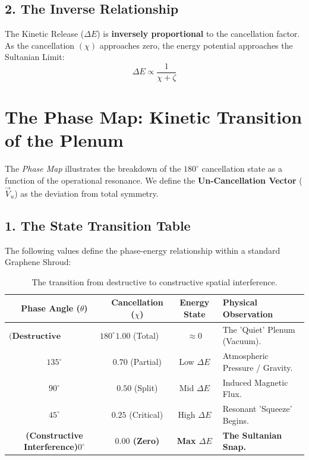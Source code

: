 \documentclass[11pt]{article}
\begin{document}
\subsection*{2. The Inverse Relationship}
The Kinetic Release ($\Delta E$) is \textbf{inversely proportional} to the cancellation factor. As the cancellation $(\chi)$ approaches zero, the energy potential approaches the Sultanian Limit:
\begin{equation}
    \Delta E \propto \frac{1}{\chi + \zeta}
\end{equation}

\section*{The Phase Map: Kinetic Transition of the Plenum}

The \textit{Phase Map} illustrates the breakdown of the $180^\circ$ cancellation state as a function of the operational resonance. We define the \textbf{Un-Cancellation Vector} ($\vec{V}_u$) as the deviation from total symmetry.

\subsection*{1. The State Transition Table}
The following values define the phase-energy relationship within a standard Graphene Shroud:

\begin{table}[h!]
\centering
\renewcommand{\arraystretch}{1.5}
\begin{tabular}{|c|c|c|l|}
\hline
\textbf{Phase Angle ($\theta$)} & \textbf{Cancellation ($\chi$)} & \textbf{Energy State} & \textbf{Physical Observation} \\ \hline
$\textbf{(Destructive Interference)} 180^\circ$ & $1.00$ (Total) & $\approx 0$ & The 'Quiet' Plenum (Vacuum). \\ \hline
$135^\circ$ & $0.70$ (Partial) & Low $\Delta E$ & Atmospheric Pressure / Gravity. \\ \hline
$90^\circ$ & $0.50$ (Split) & Mid $\Delta E$ & Induced Magnetic Flux. \\ \hline
$45^\circ$ & $0.25$ (Critical) & High $\Delta E$ & Resonant 'Squeeze' Begins. \\ \hline
\textbf{(Constructive Interference)$0^\circ$} & \textbf{$0.00$ (Zero)} & \textbf{Max $\Delta E$} & \textbf{The Sultanian Snap.} \\ \hline
\end{tabular}
\caption{The transition from destructive to constructive spatial interference.}
\end{table}
\end{document}
